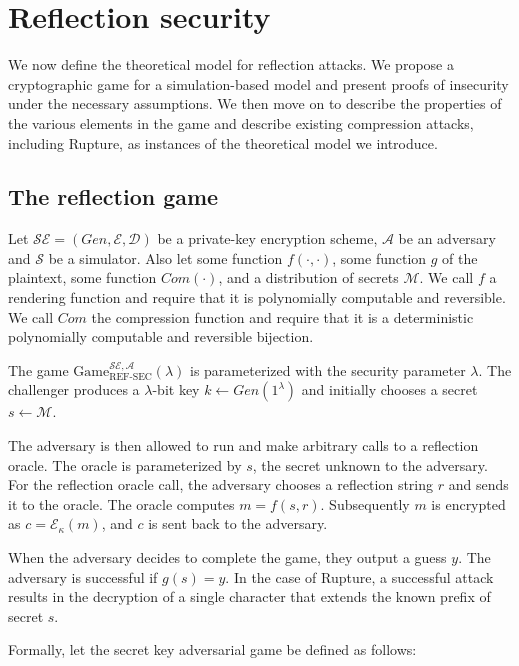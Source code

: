 \section{Reflection security}\label{sec:refsec}

We now define the theoretical model for reflection attacks. We propose a
cryptographic game for a simulation-based model and present proofs of insecurity
under the necessary assumptions. We then move on to describe the properties of
the various elements in the game and describe existing compression attacks,
including Rupture, as instances of the theoretical model we introduce.

\subsection{The reflection game}\label{subsec:refsecgame}

Let $\mathcal{SE} = (Gen, \mathcal{E}, \mathcal{D})$ be a private-key encryption
scheme, $\mathcal{A}$ be an adversary and $\mathcal{S}$ be a simulator. Also let
some function $f(\cdot, \cdot)$, some function
$g$ of the plaintext, some function $Com(\cdot)$, and a distribution of secrets
$\mathcal{M}$. We call $f$ a rendering function and require that it
is polynomially computable and reversible. We call $Com$ the compression
function and require that it is a deterministic polynomially computable and
reversible bijection.

The game $\text{Game}_{\text{REF-SEC}}^{\mathcal{SE},\mathcal{A}}(\lambda)$ is
parameterized with the security parameter $\lambda$. The challenger produces a
$\lambda$-bit key $k \leftarrow Gen(1^\lambda)$ and initially
chooses a secret $s \leftarrow \mathcal{M}$.

The adversary is then allowed to run and make arbitrary calls to a reflection
oracle. The oracle is parameterized by $s$, the secret unknown to the adversary.
For the reflection oracle call, the adversary chooses a reflection string $r$
and sends it to the oracle. The oracle computes $m = f(s, r)$. Subsequently $m$
is encrypted as $c = \mathcal{E}_\kappa(m)$, and $c$ is sent back to the
adversary.

When the adversary decides to complete the game, they output a guess $y$. The
adversary is successful if $g(s) = y$. In the case of Rupture, a successful
attack results in the decryption of a single character that extends the known
prefix of secret $s$.

Formally, let the secret key adversarial game be defined as follows:

